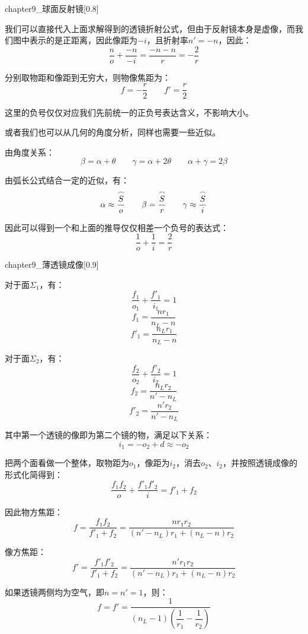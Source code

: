 \begin{prove}[球面反射镜的成像规律]
  \begin{singlefigure}[球面反射镜]{chapter9_球面反射镜}[0.8]
  \end{singlefigure}

  我们可以直接代入上面求解得到的透镜折射公式，但由于反射镜本身是虚像，而我们图中表示的是正距离，因此像距为$-i$，且折射率$n' = -n$，因此：
  \[\dfrac{n}{o} + \dfrac{-n}{-i} = \dfrac{-n-n}{r} = -\dfrac{2}{r}\]

  分别取物距和像距到无穷大，则物像焦距为：
  \[f = -\dfrac{r}{2}\qquad f' = \dfrac{r}{2}\]

  这里的负号仅仅对应我们先前统一的正负号表达含义，不影响大小。
  \tcbrule

  或者我们也可以从几何的角度分析，同样也需要一些近似。
  
  由角度关系：
  \[\beta = \alpha + \theta \qquad \gamma = \alpha + 2\theta \qquad \alpha + \gamma = 2\beta\]

  由弧长公式结合一定的近似，有：
  \[\alpha\approx\dfrac{\overset{\Large{\frown}}{S}}{o}\qquad \beta = \dfrac{\overset{\Large{\frown}}{S}}{r}\qquad \gamma\approx\dfrac{\overset{\Large{\frown}}{S}}{i}\]

  因此可以得到一个和上面的推导仅仅相差一个负号的表达式：
  \[\dfrac{1}{o} + \dfrac{1}{i} = \dfrac{2}{r}\]
\end{prove}

\begin{prove}
  \begin{singlefigure}[薄透镜成像]{chapter9_薄透镜成像}[0.9]
  \end{singlefigure}

  对于面$\Sigma_1$，有：
  \[\dfrac{f_1}{o_1} + \dfrac{f'_1}{i_1} = 1\]
  \[f_1 = \dfrac{nr_1}{n_L - n}\]
  \[f'_1 = \dfrac{n_L r_1}{n_L - n}\]

  对于面$\Sigma_2$，有：
  \[\dfrac{f_2}{o_2} + \dfrac{f'_2}{i_2} = 1\]
  \[f_2 = \dfrac{n_L r_2}{n' - n_L}\]
  \[f'_2 = \dfrac{n' r_2}{n' - n_L}\]

  其中第一个透镜的像即为第二个镜的物，满足以下关系：
  \[i_1 = -o_2 + d\approx -o_2\]

  把两个面看做一个整体，取物距为$o_1$，像距为$i_2$，消去$o_2$、$i_2$，并按照透镜成像的形式化简得到：
  \[\dfrac{f_1f_2}{o} + \dfrac{f'_1f'_2}{i} = f'_1 + f_2\]

  因此物方焦距：
  \[f = \dfrac{f_1f_2}{f'_1 + f_2} = \dfrac{nr_1 r_2}{(n'-n_L)r_1 + (n_L - n)r_2}\]

  像方焦距：
  \[f' = \dfrac{f'_1f'_2}{f'_1 + f_2} = \dfrac{n'r_1 r_2}{(n'-n_L)r_1 + (n_L - n)r_2}\]

  如果透镜两侧均为空气，即$n = n' = 1$，则：
  \[f = f' = \dfrac{1}{(n_L - 1)(\dfrac{1}{r_1} - \dfrac{1}{r_2})}\]
\end{prove}

